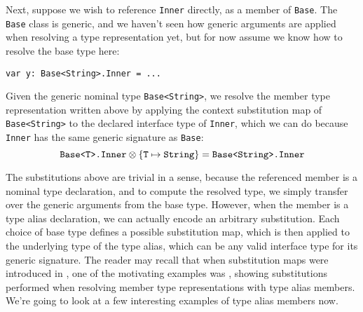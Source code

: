 \documentclass[../generics]{subfiles}
\begin{document}
Next, suppose we wish to reference \texttt{Inner} directly, as a member of \texttt{Base}. The \texttt{Base} class is generic, and we haven't seen how generic arguments are applied when resolving a type representation yet, but for now assume we know how to resolve the base type here:
\begin{Verbatim}
var y: Base<String>.Inner = ...
\end{Verbatim}
Given the generic nominal type \texttt{Base<String>}, we resolve the member type representation written above by applying the context substitution map of \texttt{Base<String>} to the declared interface type of \texttt{Inner}, which we can do because \texttt{Inner} has the same generic signature as \texttt{Base}:
\[\texttt{Base<T>.Inner}\otimes\{\texttt{T} \mapsto \texttt{String}\}=\texttt{Base<String>.Inner}\]

The substitutions above are trivial in a sense, because the referenced member is a nominal type declaration, and to compute the resolved type, we simply transfer over the generic arguments from the base type. However, when the member is a type alias declaration, we can actually encode an arbitrary substitution. Each choice of base type defines a possible substitution map, which is then applied to the underlying type of the type alias, which can be any valid interface type for its generic signature. The reader may recall that when substitution maps were introduced in , one of the motivating examples was , showing substitutions performed when resolving member type representations with type alias members. We're going to look at a few interesting examples of type alias members now.

\smallskip
\end{document}
